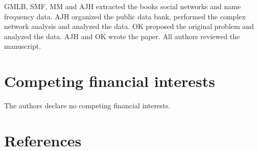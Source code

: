 \documentclass[review]{elsarticle}
\begin{document}
GMLB, SMF, MM and AJH extracted the books social networks and 
name frequency data. AJH organized the public data bank, 
performed the complex network analysis and analyzed the data.
OK proposed the original problem and analyzed the data. AJH and
OK wrote the paper. All authors reviewed the manuscript.

\section*{Competing financial interests} The authors 
declare no competing financial interests.

\section*{References}

 

\end{document}
